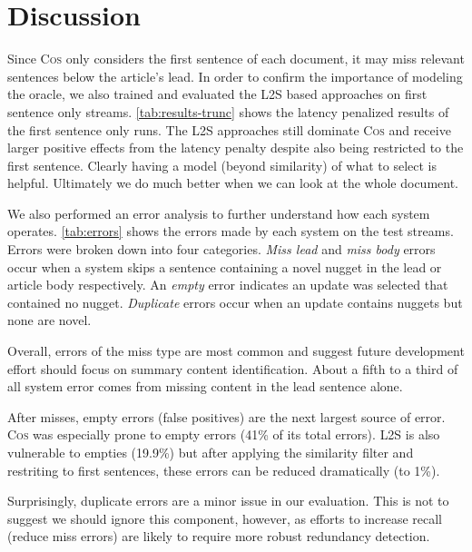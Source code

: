 \section{Discussion} \label{sec:discussion}

  Since \textsc{Cos} only considers the first sentence of each document, it
 may miss relevant sentences below the article's lead. In order to confirm the
 importance of modeling the oracle, we also trained and evaluated the
 \textsc{L2S} based approaches on first sentence only streams. 
 \autoref{tab:results-trunc} shows the latency penalized results of the first
 sentence only runs.  The \textsc{L2S} approaches still dominate \textsc{Cos}
 and receive larger positive effects from the latency penalty despite also
 being restricted to the first sentence. Clearly having a model (beyond
 similarity) of what to select is helpful. Ultimately we do much better when
 we can look at the whole document.
  

 
 
 We also performed an error analysis to further understand how each system
 operates.  \autoref{tab:errors} shows the errors made by each system on
 the test streams.  Errors were broken down into four categories. \emph{Miss
 lead} and \emph{miss body} errors occur when a system skips a sentence
 containing a novel nugget in the lead or article body respectively. An
 \emph{empty} error indicates an update was selected that contained no nugget.
 \emph{Duplicate} errors occur when an update contains nuggets but none are
 novel. 
 
  Overall, errors of the miss type are most common and suggest future
 development effort should focus on summary content identification.  About a
 fifth to a third of all system error comes from missing content in the lead
 sentence alone.
 
  After misses, empty errors (false positives) are the next largest source of
 error. \textsc{Cos} was especially prone to empty errors (41\% of its total
 errors). \textsc{L2S} is also vulnerable to empties (19.9\%) but after
 applying the similarity filter and restriting to first sentences, these
 errors can be reduced dramatically (to 1\%).
  
  Surprisingly, duplicate errors are a minor issue in our evaluation. This is
 not to suggest we should ignore this component, however, as efforts to
 increase recall (reduce miss errors) are likely to require more robust
 redundancy detection. 


